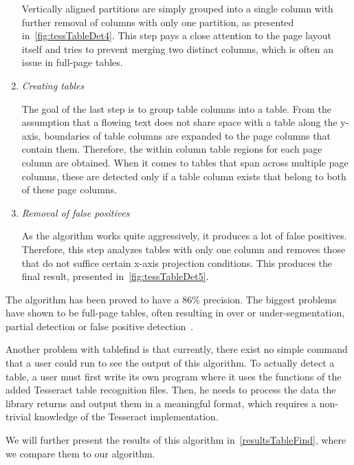 \begin{enumerate}
Vertically aligned partitions are simply grouped into a single column with further removal of columns with only one partition, as presented in~\cref{fig:tessTableDet4}. This step pays a close attention to the page layout itself and tries to prevent merging two distinct columns, which is often an issue in full-page tables.

\item \emph{Creating tables}

The goal of the last step is to group table columns into a table. From the assumption that a flowing text does not share space with a table along the y-axis, boundaries of table columns are expanded to the page columns that contain them. Therefore, the within column table regions for each page column are obtained. When it comes to tables that span across multiple page columns, these are detected only if a table column exists that belong to both of these page columns.

\item \emph{Removal of false positives}

As the algorithm works quite aggressively, it produces a lot of false positives. Therefore, this step analyzes tables with only one column and removes those that do not suffice certain x-axis projection conditions. This produces the final result, presented in~\cref{fig:tessTableDet5}.

\end{enumerate}

The algorithm has been proved to have a 86\% precision. The biggest problems have shown to be full-page tables, often resulting in over or under-segmentation, partial detection or false positive detection~\citep{tableDetHeterogeneous}.

Another problem with tablefind is that currently, there exist no simple command that a user could run to see the output of this algorithm. To actually detect a table, a user must first write its own program where it uses the functions of the added Tesseract table recognition files. Then, he needs to process the data the library returns and output them in a meaningful format, which requires a non-trivial knowledge of the Tesseract implementation.

We will further present the results of this algorithm in~\cref{resultsTableFind}, where we compare them to our algorithm.
   
